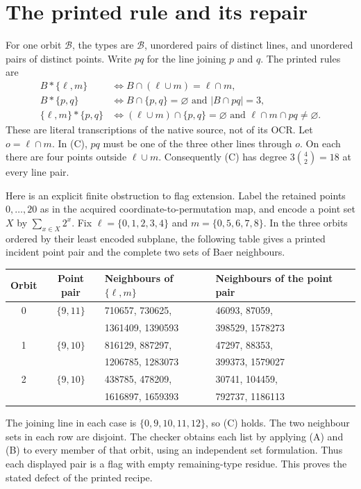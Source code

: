 \documentclass[11pt]{article}
\begin{document}
\section{The printed rule and its repair}
For one orbit $\mathcal B$, the types are $\mathcal B$, unordered pairs
of distinct lines, and unordered pairs of distinct points. Write $pq$
for the line joining $p$ and $q$. The printed rules are
\begin{align}
B*\{\ell,m\}&\iff B\cap(\ell\cup m)=\ell\cap m,\tag{A}\\
B*\{p,q\}&\iff B\cap\{p,q\}=\varnothing\text{ and }|B\cap pq|=3,\tag{B}\\
\{\ell,m\}*\{p,q\}&\iff (\ell\cup m)\cap\{p,q\}=\varnothing
\text{ and }\ell\cap m\cap pq\ne\varnothing.\tag{C}
\end{align}
These are literal transcriptions of the native source, not of its OCR.
Let $o=\ell\cap m$. In (C), $pq$ must be one of the three other lines
through $o$. On each there are four points outside $\ell\cup m$.
Consequently (C) has degree $3\binom42=18$ at every line pair.

Here is an explicit finite obstruction to flag extension. Label the
retained points $0,\ldots,20$ as in the acquired coordinate-to-permutation
map, and encode a point set $X$ by $\sum_{x\in X}2^x$. Fix
$\ell=\{0,1,2,3,4\}$ and $m=\{0,5,6,7,8\}$. In the three orbits
ordered by their least encoded subplane, the following table gives a
printed incident point pair and the complete two sets of Baer neighbours.
\begin{center}\small
\begin{tabular}{ccll}\toprule
Orbit&Point pair&Neighbours of $\{\ell,m\}$&Neighbours of the point pair\\\midrule
0&$\{9,11\}$&710657, 730625,&46093, 87059,\\
&&1361409, 1390593&398529, 1578273\\
1&$\{9,10\}$&816129, 887297,&47297, 88353,\\
&&1206785, 1283073&399373, 1579027\\
2&$\{9,10\}$&438785, 478209,&30741, 104459,\\
&&1616897, 1659393&792737, 1186113\\\bottomrule
\end{tabular}
\end{center}
The joining line in each case is $\{0,9,10,11,12\}$, so (C) holds.
The two neighbour sets in each row are disjoint. The checker obtains
each list by applying (A) and (B) to every member of that orbit, using
an independent set formulation. Thus each displayed pair is a flag
with empty remaining-type residue. This proves the stated defect of
the printed recipe.
\end{document}
